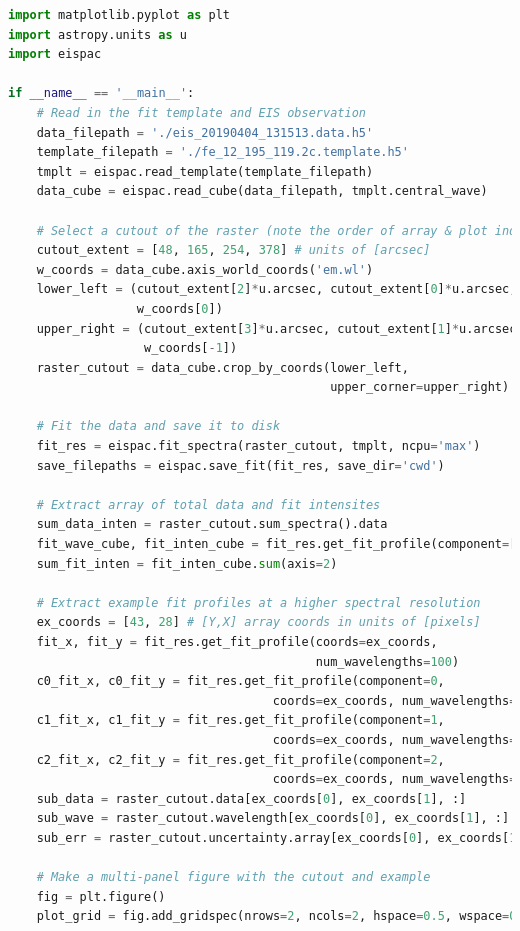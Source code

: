 \begin{lstlisting}[language=Python]
import matplotlib.pyplot as plt
import astropy.units as u
import eispac

if __name__ == '__main__':
    # Read in the fit template and EIS observation
    data_filepath = './eis_20190404_131513.data.h5'
    template_filepath = './fe_12_195_119.2c.template.h5'
    tmplt = eispac.read_template(template_filepath)
    data_cube = eispac.read_cube(data_filepath, tmplt.central_wave)

    # Select a cutout of the raster (note the order of array & plot indices!)
    cutout_extent = [48, 165, 254, 378] # units of [arcsec]
    w_coords = data_cube.axis_world_coords('em.wl')
    lower_left = (cutout_extent[2]*u.arcsec, cutout_extent[0]*u.arcsec,         
                  w_coords[0])
    upper_right = (cutout_extent[3]*u.arcsec, cutout_extent[1]*u.arcsec, 
                   w_coords[-1])
    raster_cutout = data_cube.crop_by_coords(lower_left, 
                                             upper_corner=upper_right)

    # Fit the data and save it to disk
    fit_res = eispac.fit_spectra(raster_cutout, tmplt, ncpu='max')
    save_filepaths = eispac.save_fit(fit_res, save_dir='cwd')

    # Extract array of total data and fit intensites
    sum_data_inten = raster_cutout.sum_spectra().data
    fit_wave_cube, fit_inten_cube = fit_res.get_fit_profile(component=[0,1])
    sum_fit_inten = fit_inten_cube.sum(axis=2)

    # Extract example fit profiles at a higher spectral resolution
    ex_coords = [43, 28] # [Y,X] array coords in units of [pixels]
    fit_x, fit_y = fit_res.get_fit_profile(coords=ex_coords, 
                                           num_wavelengths=100)
    c0_fit_x, c0_fit_y = fit_res.get_fit_profile(component=0, 
                                     coords=ex_coords, num_wavelengths=100)
    c1_fit_x, c1_fit_y = fit_res.get_fit_profile(component=1,
                                     coords=ex_coords, num_wavelengths=100)
    c2_fit_x, c2_fit_y = fit_res.get_fit_profile(component=2,
                                     coords=ex_coords, num_wavelengths=100)
    sub_data = raster_cutout.data[ex_coords[0], ex_coords[1], :]
    sub_wave = raster_cutout.wavelength[ex_coords[0], ex_coords[1], :]
    sub_err = raster_cutout.uncertainty.array[ex_coords[0], ex_coords[1], :]

    # Make a multi-panel figure with the cutout and example
    fig = plt.figure()
    plot_grid = fig.add_gridspec(nrows=2, ncols=2, hspace=0.5, wspace=0.3)


\end{lstlisting}
